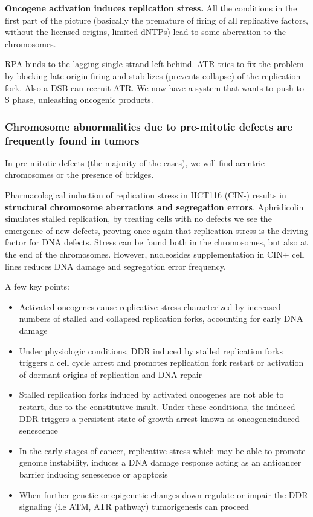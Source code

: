 \textbf{Oncogene activation induces replication stress.} All the
conditions in the first part of the picture (basically the premature of
firing of all replicative factors, without the licensed origins, limited
dNTPs) lead to some aberration to the chromosomes.

RPA binds to the lagging single strand left behind.  ATR tries to fix
the problem by blocking late origin firing and stabilizes (prevents
collapse) of the replication fork. Also a DSB can recruit ATR.
We
now have a system that wants to push to S phase, unleashing oncogenic
products.

\hypertarget{chromosome-abnormalities-due-to-pre-mitotic-defects-are-frequently-found-in-tumors}{%
\subsubsection{Chromosome abnormalities due to pre-mitotic defects are
frequently found in
tumors}\label{chromosome-abnormalities-due-to-pre-mitotic-defects-are-frequently-found-in-tumors}}

In pre-mitotic defects (the majority of the cases),  we will
find acentric chromosomes or the presence of bridges.

Pharmacological induction of replication stress in HCT116 (CIN-) results
in \textbf{structural chromosome aberrations and segregation errors}.
Aphridicolin simulates stalled replication, by treating cells with no
defects we see the emergence of new defects, proving once again that
replication stress is the driving factor for DNA defects. Stress can be
found both in the chromosomes, but also at the end of the chromosomes.
However, nucleosides supplementation in CIN+ cell lines reduces DNA damage
and segregation error frequency.

A few key points: 
\begin{itemize}
\tightlist
\item Activated oncogenes cause replicative stress
characterized by increased numbers of stalled and collapsed replication
forks, accounting for early DNA damage
\item Under physiologic conditions,
DDR induced by stalled replication forks triggers a cell cycle arrest
and promotes replication fork restart or activation of dormant origins
of replication and DNA repair
\item Stalled replication forks induced by
activated oncogenes are not able to restart, due to the constitutive
insult. Under these conditions, the induced DDR triggers a persistent
state of growth arrest known as oncogeneinduced senescence
\item In the
early stages of cancer, replicative stress which may be able to promote
genome instability, induces a DNA damage response acting as an
anticancer barrier inducing senescence or apoptosis
\item When further
genetic or epigenetic changes down-regulate or impair the DDR signaling
(i.e ATM, ATR pathway) tumorigenesis can proceed
\end{itemize}

